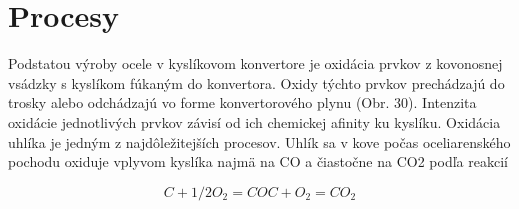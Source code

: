 \section{Procesy}

Podstatou výroby ocele v kyslíkovom konvertore je oxidácia prvkov z kovonosnej vsádzky s kyslíkom fúkaným do konvertora. Oxidy týchto prvkov prechádzajú do trosky alebo odchádzajú vo forme konvertorového plynu (Obr. 30). Intenzita oxidácie jednotlivých prvkov závisí od ich chemickej afinity ku kyslíku.
Oxidácia uhlíka je jedným z najdôležitejších procesov. Uhlík sa v kove počas
oceliarenského pochodu oxiduje vplyvom kyslíka najmä na CO a čiastočne na CO2 podľa reakcií

\begin{equation}
C + 1/2O_2 = CO
C + O_2 = CO_2
\end{equation}
